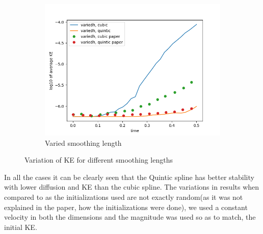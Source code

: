 \documentclass{beamer}
\begin{document}
\begin{frame}
\begin{figure}[H]
\begin{subfigure}[b]{0.33\textwidth}
\centering
\includegraphics[width=\linewidth]{./case12.png}
\caption{Varied smoothing length}
\end{subfigure}
\caption{Variation of KE for different smoothing lengths}
\end{figure}

In all the cases it can be clearly seen that the Quintic spline has better stability with lower diffusion and KE than the cubic spline. The variations in results when compared to as the initializations used are not exactly random(as it was not explained in the paper, how the initializations were done),
we used a constant velocity in both the dimensions and the magnitude was used so as to match, the initial KE. 
\end{frame}
\end{document}
